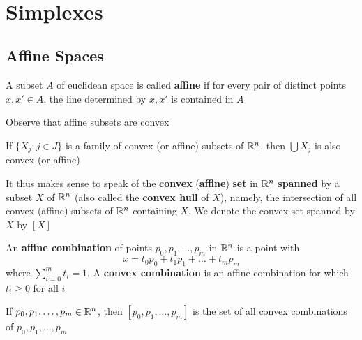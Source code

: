 \documentclass[11pt]{article}
\begin{document}
​

\section{Simplexes}
\label{sec:org6052e8b}

\subsection{Affine Spaces}
\label{sec:org3536fb1}
\begin{definition}[]
A subset \(A\) of euclidean space is called \textbf{affine} if for every pair of distinct
points \(x,x'\in A\), the line determined by \(x,x'\) is contained in \(A\)
\end{definition}

Observe that affine subsets are convex

\begin{theorem}[]
If \(\{X_j:j\in J\}\) is a family of convex (or affine) subsets of \(\mathbb{R}^n\), then \(\bigcup X_j\) is also
convex (or affine)
\end{theorem}

It thus makes sense to speak of the \textbf{convex} (\textbf{affine}) \textbf{set} in \(\mathbb{R}^n\) \textbf{spanned} by a subset \(X\)
of \(\mathbb{R}^n\) (also called the \textbf{convex hull} of \(X\)), namely, the intersection of all convex (affine)
subsets of \(\mathbb{R}^n\) containing \(X\). We denote the convex set spanned by \(X\) by \([X]\)

\begin{definition}[]
An \textbf{affine combination} of points \(p_0,p_1,\dots,p_m\) in \(\mathbb{R}^n\) is a point with
\begin{equation*}
x=t_0p_0+t_1p_1+\dots+t_mp_m
\end{equation*}
where \(\sum_{i=0}^mt_i=1\). A \textbf{convex combination} is an affine combination for which \(t_i\ge 0\) for all \(i\)
\end{definition}

\begin{theorem}[]
\label{thm2.2}
If \(p_0,p_1,\dots,p_m\in\mathbb{R}^n\), then \([p_0,p_1,\dots,p_m]\) is the set of all convex combinations of \(p_0,p_1,\dots,p_m\)
\end{theorem}
\end{document}
